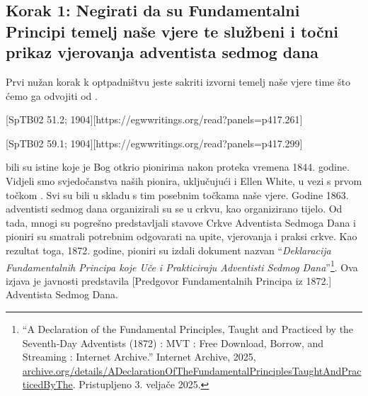 \subsection*{Korak 1: Negirati da su Fundamentalni Principi temelj naše vjere te službeni i točni prikaz vjerovanja adventista sedmog dana}

Prvi nužan korak k optpadništvu jeste sakriti izvorni temelj naše vjere time što ćemo ga odvojiti od .

[SpTB02 51.2; 1904][https://egwwritings.org/read?panels=p417.261]

[SpTB02 59.1; 1904][https://egwwritings.org/read?panels=p417.299]

 bili su istine koje je Bog otkrio pionirima nakon proteka vremena 1844. godine. Vidjeli smo svjedočanstva naših pionira, uključujući i Ellen White, u vezi s prvom točkom . Svi su bili u skladu s tim posebnim točkama naše vjere. Godine 1863. adventisti sedmog dana organizirali su se u crkvu, kao organizirano tijelo. Od tada, mnogi su pogrešno predstavljali stavove Crkve Adventista Sedmoga Dana i pioniri su smatrali potrebnim odgovarati na upite,  vjerovanja i praksi crkve. Kao rezultat toga, 1872. godine, pioniri su izdali dokument nazvan “\textit{Deklaracija Fundamentalnih Principa koje Uče i Prakticiraju Adventisti Sedmog Dana}”\footnote{“A Declaration of the Fundamental Principles, Taught and Practiced by the Seventh-Day Adventists (1872) : MVT : Free Download, Borrow, and Streaming : Internet Archive.” Internet Archive, 2025, \href{https://archive.org/details/ADeclarationOfTheFundamentalPrinciplesTaughtAndPracticedByThe}{archive.org/details/ADeclarationOfTheFundamentalPrinciplesTaughtAndPracticedByThe}. Pristupljeno 3. veljače 2025.}. Ova izjava je javnosti predstavila [Predgovor Fundamentalnih Principa iz 1872.] Adventista Sedmog Dana.


